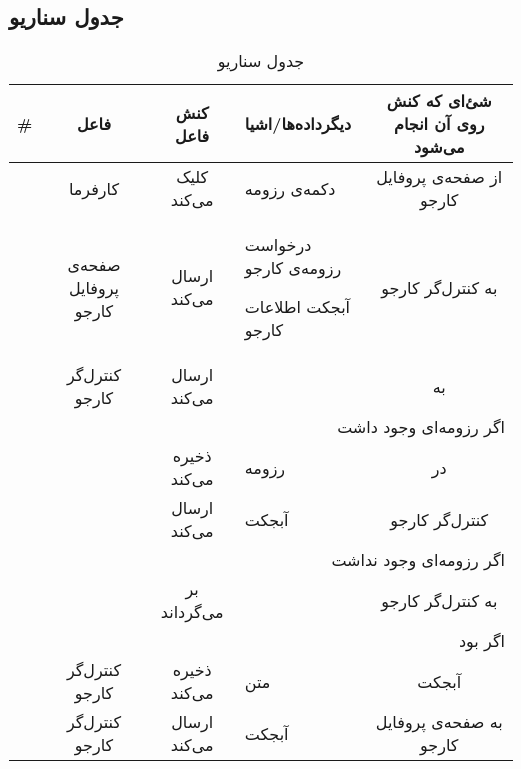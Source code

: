 
\setcounter{MainStepCounter}{0}

\subsection{جدول سناریو}
\newcommand{\sstep}{\stepcounter{SenarioCounter}\arabic{SenarioCounter}}
\begin{table}[H]
	\caption{جدول سناریو }
	\begin{adjustbox}{width=\textwidth}
		\begin{tabular}{|c|c|c|p{}|c|}
			\hline
			\# & فاعل & کنش فاعل & دیگرداده‌ها/اشیا & شئ‌ای که کنش روی آن انجام می‌شود \\
			\hline
			\hline
			\sstep & 
			کارفرما &
			کلیک می‌کند &
			دکمه‌ی رزومه &
			از صفحه‌ی پروفایل کارجو \\
			\hline
			\sstep & 
			صفحه‌ی پروفایل کارجو &
			ارسال می‌کند &
			\begin{inparaitem}
				\item درخواست رزومه‌ی کارجو
				\item آبجکت \json اطلاعات کارجو
			\end{inparaitem} &
			به کنترل‌گر کارجو \\
			\hline
			\sstep & 
			کنترل‌گر کارجو &
			ارسال می‌کند &
			\json &
			به \gdm \\
			\hline
			\sstep & \multicolumn{4}{|r|}{اگر رزومه‌ای وجود داشت} \\
			\hline
			\sstep & 
			\gdm &
			ذخیره می‌کند &
			رزومه &
			در \json\\
			\hline
			\sstep & 
			\gdm &
			ارسال می‌کند &
			آبجکت \json &
			کنترل‌گر کارجو \\
			\hline
			\sstep & \multicolumn{4}{|r|}{اگر رزومه‌ای وجود نداشت}\\
			\hline
			\sstep & 
			\gdm&
			بر می‌گرداند &
			\none&
			به کنترل‌گر کارجو \\
			\hline
			\sstep & \multicolumn{4}{|r|}{اگر \none بود} \\
			\hline
			\sstep & 
			کنترل‌گر کارجو &
			ذخیره می‌کند &
			متن \say{عدم وجود رزومه}&
			آبجکت \json\\
			\hline
			\sstep & 
			کنترل‌گر کارجو &
			ارسال می‌کند &
			آبجکت \json &
			به صفحه‌ی پروفایل کارجو \\
			\hline
		\end{tabular}
	\end{adjustbox}
\end{table}
\setcounter{MainStepCounter}{0}
\setcounter{SenarioCounter}{0}
